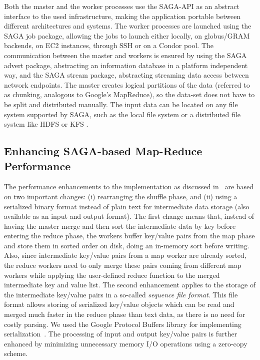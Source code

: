 \documentclass[3p,twocolumn]{elsarticle}
\begin{document}
Both the master and the worker processes use the SAGA-API as an
abstract interface to the used infrastructure, making the application
portable between different architectures and systems.  The worker
processes are launched using the SAGA job package, allowing the jobs
to launch either locally, on globus/GRAM backends, on EC2 instances, through SSH
or on a Condor pool. The communication between the master and workers
is ensured by using the SAGA advert package, abstracting an
information database in a platform independent way, and the SAGA stream
package, abstracting streaming data access between network endpoints.
The master creates logical partitions of the data (referred to as chunking,
analogous to Google's MapReduce), so the data-set does not have to be split
and distributed manually.  The input data can be located on any file system
supported by SAGA, such as the local file system or a distributed file system
like HDFS or KFS \cite{KFS}.


\subsection{Enhancing SAGA-based Map-Reduce Performance}

The performance enhancements to the \sagamapreduce implementation as
discussed in~\cite{saga_ccgrid09} are based on two important changes:
(i) rearranging the shuffle phase, and (ii) using a serialized binary
format instead of plain text for intermediate data storage (also
available as an input and output format).  The first change means
that, instead of having the master merge and then sort the
intermediate data by key before entering the reduce phase, the workers
buffer key/value pairs from the map phase and store them in sorted
order on disk, doing an in-memory sort before writing. Also, since
intermediate key/value pairs from a map worker are already sorted, the
reduce workers need to only merge these pairs coming from different
map workers while applying the user-defined reduce function to the
merged intermediate key and value list.  The second enhancement
applies to the storage of the intermediate key/value pairs in a
so-called \emph{sequence file format}. This file format allows storing
of serialized key/value objects which can be read and merged much
faster in the reduce phase than text data, as there is no need for
costly parsing.  We used the Google Protocol Buffers library for
implementing serialization~\cite{protobuf}.  The processing of input
and output key/value pairs is further enhanced by minimizing
unnecessary memory I/O operations using a zero-copy scheme.
\end{document}
